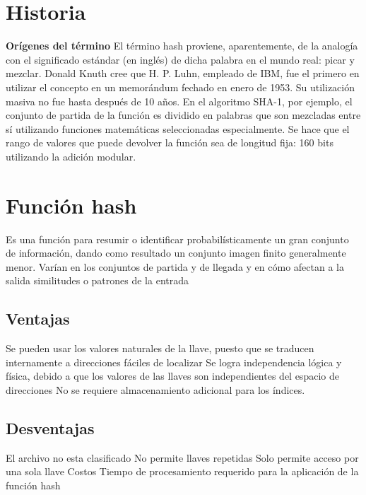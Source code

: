 \documentclass[letterpaper,openright,12pt]{report}
\begin{document}
\section{Historia}

\textbf{Orígenes del término} El término hash proviene, aparentemente,
de la analogía con el significado estándar (en inglés) de dicha palabra
en el mundo real: picar y mezclar. Donald Knuth cree que H. P. Luhn,
empleado de IBM, fue el primero en utilizar el concepto en un memorándum
fechado en enero de 1953. Su utilización masiva no fue hasta después de
10 años. En el algoritmo SHA-1, por ejemplo, el conjunto de partida de
la función es dividido en palabras que son mezcladas entre sí utilizando
funciones matemáticas seleccionadas especialmente. Se hace que el rango
de valores que puede devolver la función sea de longitud fija: 160 bits
utilizando la adición modular.
\newpage
\section{Función hash}

Es una función para resumir o identificar probabilísticamente un gran
conjunto de información, dando como resultado un conjunto imagen finito
generalmente menor. Varían en los conjuntos de partida y de llegada y en
cómo afectan a la salida similitudes o patrones de la entrada

\subsection{Ventajas}

Se pueden usar los valores naturales de la llave, puesto que se traducen
internamente a direcciones fáciles de localizar Se logra independencia
lógica y física, debido a que los valores de las llaves son
independientes del espacio de direcciones No se requiere almacenamiento
adicional para los índices.

\subsection{Desventajas}

El archivo no esta clasificado No permite llaves repetidas Solo permite
acceso por una sola llave Costos Tiempo de procesamiento requerido para
la aplicación de la función hash
\end{document}
